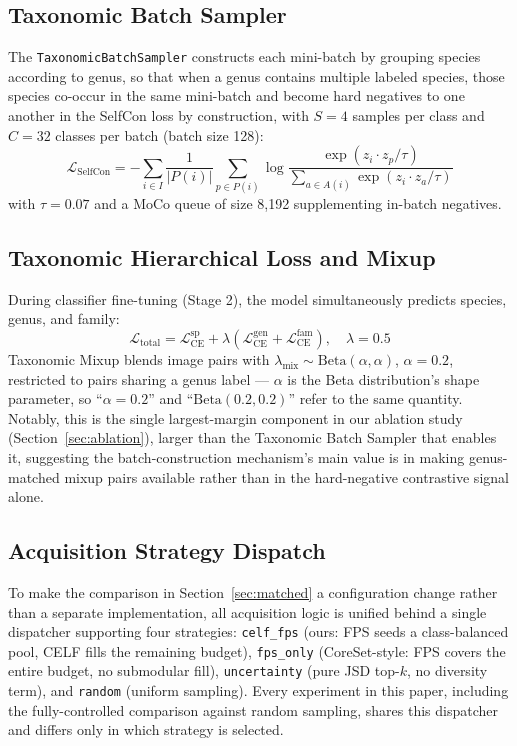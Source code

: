 \documentclass[conference]{IEEEtran}
\begin{document}
\subsection{Taxonomic Batch Sampler}
The \texttt{TaxonomicBatchSampler} constructs each mini-batch by grouping species according to genus, so that when a genus contains multiple labeled species, those species co-occur in the same mini-batch and become hard negatives to one another in the SelfCon loss by construction, with $S{=}4$ samples per class and $C{=}32$ classes per batch (batch size 128):
\begin{equation}
\mathcal{L}_{\text{SelfCon}} = -\sum_{i \in I} \frac{1}{|P(i)|} \sum_{p \in P(i)} \log \frac{\exp(z_i \cdot z_p / \tau)}{\sum_{a \in A(i)} \exp(z_i \cdot z_a / \tau)}
\end{equation}
with $\tau{=}0.07$ and a MoCo queue of size 8{,}192 supplementing in-batch negatives.

\subsection{Taxonomic Hierarchical Loss and Mixup}
During classifier fine-tuning (Stage 2), the model simultaneously predicts species, genus, and family:
\begin{equation}
\mathcal{L}_{\text{total}} = \mathcal{L}_{\text{CE}}^{\text{sp}} + \lambda\left(\mathcal{L}_{\text{CE}}^{\text{gen}} + \mathcal{L}_{\text{CE}}^{\text{fam}}\right), \quad \lambda{=}0.5
\end{equation}
Taxonomic Mixup blends image pairs with $\lambda_{\text{mix}} \sim \text{Beta}(\alpha, \alpha)$, $\alpha{=}0.2$, restricted to pairs sharing a genus label — $\alpha$ is the Beta distribution's shape parameter, so ``$\alpha{=}0.2$'' and ``$\text{Beta}(0.2,0.2)$'' refer to the same quantity. Notably, this is the single largest-margin component in our ablation study (Section~\ref{sec:ablation}), larger than the Taxonomic Batch Sampler that enables it, suggesting the batch-construction mechanism's main value is in making genus-matched mixup pairs available rather than in the hard-negative contrastive signal alone.

\subsection{Acquisition Strategy Dispatch}
\label{sec:dispatch}
To make the comparison in Section~\ref{sec:matched} a configuration change rather than a separate implementation, all acquisition logic is unified behind a single dispatcher supporting four strategies: \texttt{celf\_fps} (ours: FPS seeds a class-balanced pool, CELF fills the remaining budget), \texttt{fps\_only} (CoreSet-style: FPS covers the entire budget, no submodular fill), \texttt{uncertainty} (pure JSD top-$k$, no diversity term), and \texttt{random} (uniform sampling). Every experiment in this paper, including the fully-controlled comparison against random sampling, shares this dispatcher and differs only in which strategy is selected.
\end{document}
